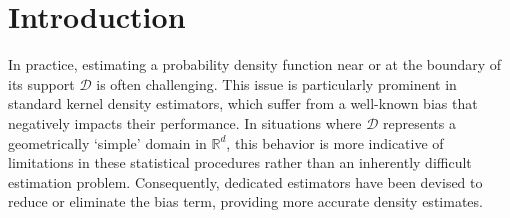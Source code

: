 \documentclass[bj,authoryear]{imsart}
\numberwithin{equation}{section}
\theoremstyle{plain}
\theoremstyle{remark}
\newcommand{\R}{\mathbb{R}}
\newcommand{\1}{\mathds{1}}
\newcommand{\domain}{\mathcal{D}}
\begin{document}
\begin{frontmatter}
\begin{keyword} %
\end{keyword}

\end{frontmatter}

\section{Introduction}\label{sec:introduction}

    In practice, estimating a probability density function near or at the boundary of its support $\domain$ is often challenging. This issue is particularly prominent in standard kernel density estimators, which suffer from a well-known bias that negatively impacts their performance. In situations where $\domain$ represents a geometrically `simple' domain in $\R^d$, this behavior is more indicative of limitations in these statistical procedures rather than an inherently difficult estimation problem. Consequently, dedicated estimators have been devised to reduce or eliminate the bias term, providing more accurate density estimates.
\end{document}
